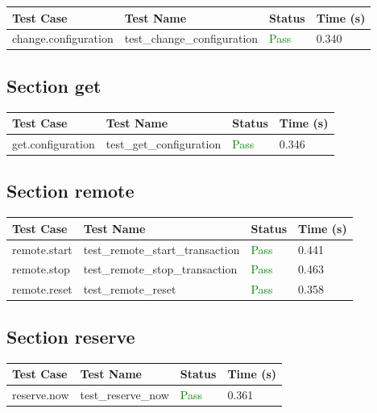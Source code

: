 \documentclass{article}
\begin{document}
\begin{longtable}{p{} p{} p{} p{}}
\toprule
\textbf{Test Case} & \textbf{Test Name} & \textbf{Status} & \textbf{Time (s)} \\
\midrule
\endhead
change.configuration & test\_change\_configuration & \textcolor{green}{Pass} & 0.340 \\
\bottomrule
\end{longtable}
\subsection{Section get}

\begin{longtable}{p{} p{} p{} p{}}
\toprule
\textbf{Test Case} & \textbf{Test Name} & \textbf{Status} & \textbf{Time (s)} \\
\midrule
\endhead
get.configuration & test\_get\_configuration & \textcolor{green}{Pass} & 0.346 \\
\bottomrule
\end{longtable}
\subsection{Section remote}

\begin{longtable}{p{} p{} p{} p{}}
\toprule
\textbf{Test Case} & \textbf{Test Name} & \textbf{Status} & \textbf{Time (s)} \\
\midrule
\endhead
remote.start & test\_remote\_start\_transaction & \textcolor{green}{Pass} & 0.441 \\
remote.stop & test\_remote\_stop\_transaction & \textcolor{green}{Pass} & 0.463 \\
remote.reset & test\_remote\_reset & \textcolor{green}{Pass} & 0.358 \\
\bottomrule
\end{longtable}
\subsection{Section reserve}

\begin{longtable}{p{} p{} p{} p{}}
\toprule
\textbf{Test Case} & \textbf{Test Name} & \textbf{Status} & \textbf{Time (s)} \\
\midrule
\endhead
reserve.now & test\_reserve\_now & \textcolor{green}{Pass} & 0.361 \\
\bottomrule
\end{longtable}
\end{document}
